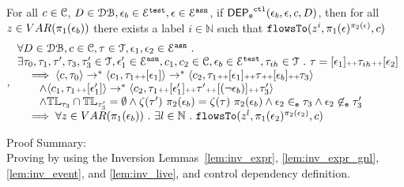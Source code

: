 %
\begin{lem}
	\label{lem:ctldep_inv}
	For all $c \in \mathcal{C}$, $D \in \mathcal{DB}, \mathtt{\epsilon}_b \in \mathcal{E}^{\mathtt{{test}}}, \mathtt{\epsilon} \in \mathcal{E}^{\mathtt{{asn}}} $, if 
	$\mathsf{DEP_{\mathtt{e}}}^{\mathtt{{ctl}}}(\mathtt{\epsilon}_b, \mathtt{\epsilon}, c, D)$, 
	then for all  $z \in VAR(\pi_1(\mathtt{\epsilon}_b))$ there exists a label $i \in \mathbb{N}$ such that 
	$\mathtt{flowsTo}(z^i, \pi_1(\mathtt{\epsilon})^{\pi_2(\mathtt{\epsilon})}, c)$
	\begin{equation}
		\label{eq:ctlflowsto_inv},		
		\begin{array}{l}
			\forall D \in \mathcal{DB} , c \in \mathcal{C}, \mathtt{\tau} \in \mathcal{T},
			\mathtt{\epsilon}_1, \mathtt{\epsilon}_2 \in \mathcal{E}^{\mathtt{{asn}}} ~.~ 
			\\ 
			\exists \mathtt{\tau}_0,
			\mathtt{\tau}_1, \mathtt{\tau}', \mathtt{\tau}_3, \mathtt{\tau}_3' \in \mathcal{T},\mathtt{\epsilon}_1' \in \mathcal{E}^{\mathtt{{asn}}}, {c}_1, {c}_2  \in \mathcal{C}, 
			\mathtt{\epsilon}_b \in \mathcal{E}^{\mathtt{{test}}},
			\mathtt{\tau}_{ih} \in \mathcal{T} ~.~ 
		\mathtt{\tau} = [\mathtt{\epsilon}_1] {\scriptscriptstyle ++} \mathtt{\tau}_{ih} {\scriptscriptstyle ++} [\mathtt{\epsilon}_2]
		\\ \quad \implies	  
			  \langle {c}, \mathtt{\tau}_0 \rangle \rightarrow^{*} 
				\langle {c}_1, \mathtt{\tau}_1 {\scriptscriptstyle ++} [\mathtt{\epsilon}_1] \rangle  \rightarrow^{*} 
				\langle c_2,  \mathtt{\tau}_1 {\scriptscriptstyle ++} [\mathtt{\epsilon}_1] {\scriptscriptstyle ++} \mathtt{\tau} {\scriptscriptstyle ++} [\mathtt{\epsilon}_b] {\scriptscriptstyle ++}  \mathtt{\tau}_3 \rangle 
			  \\ \qquad \land
			  \langle {c}_1, \mathtt{\tau}_1 {\scriptscriptstyle ++} [\mathtt{\epsilon}_1'] \rangle  \rightarrow^{*} 
			  \langle c_2,  \mathtt{\tau}_1 {\scriptscriptstyle ++} [\mathtt{\epsilon}_1'] {\scriptscriptstyle ++} \mathtt{\tau}' {\scriptscriptstyle ++} [(\neg \mathtt{\epsilon}_b)] {\scriptscriptstyle ++} \mathtt{\tau}_3' \rangle 
			  \\ \qquad \land
			\mathbb{TL}_{\mathtt{\tau}_3} \cap \mathbb{TL}_{\mathtt{\tau}_3'} = \emptyset
			   \land \mathtt{\zeta}(\mathtt{\tau}') ~  \pi_2(\mathtt{\epsilon}_b) = \mathtt{\zeta}(\mathtt{\tau}) ~  \pi_2(\mathtt{\epsilon}_b)
				\land \mathtt{\epsilon}_2 \in_{\mathtt{e}} \mathtt{\tau}_3
			  \land \mathtt{\epsilon}_2 \not\in_{\mathtt{e}} \mathtt{\tau}_3'
		\\ \quad \implies	
		\forall z \in VAR(\pi_1(\mathtt{\epsilon}_b)) ~.~ 
		\exists l \in \mathbb{N} ~.~ 
		\mathtt{flowsTo}(z^l, \pi_1(\mathtt{\epsilon}_2)^{\pi_2(\mathtt{\epsilon}_2)},c)
	\end{array}
\end{equation}
	\end{lem}
	Proof Summary:
	\\
	Proving by using the Inversion Lemmas~\ref{lem:inv_expr}, \ref{lem:inv_expr_gnl}, 
	\ref{lem:inv_event}, and \ref{lem:inv_live}, and control dependency definition.
%
